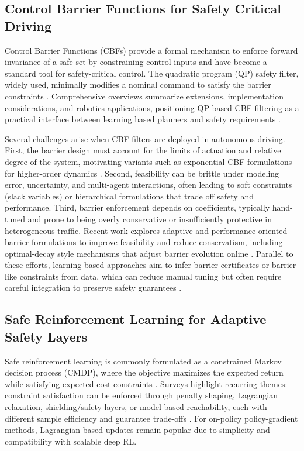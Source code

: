 %

\subsection{Control Barrier Functions for Safety Critical Driving}
Control Barrier Functions (CBFs) provide a formal mechanism to enforce forward invariance of a safe set by constraining control inputs and have become a standard tool for safety-critical control. The quadratic program (QP) safety filter, widely used, minimally modifies a nominal command to satisfy the barrier constraints \cite{ames2017cbf}. Comprehensive overviews summarize extensions, implementation considerations, and robotics applications, positioning QP-based CBF filtering as a practical interface between learning based planners and safety requirements \cite{ames_control_2019}.

Several challenges arise when CBF filters are deployed in autonomous driving. First, the barrier design must account for the limits of actuation and relative degree of the system, motivating variants such as exponential CBF formulations for higher-order dynamics \cite{nguyen2016ecbf}. Second, feasibility can be brittle under modeling error, uncertainty, and multi-agent interactions, often leading to soft constraints (slack variables) or hierarchical formulations that trade off safety and performance. Third, barrier enforcement depends on coefficients, typically hand-tuned and prone to being overly conservative or insufficiently protective in heterogeneous traffic. Recent work explores adaptive and performance-oriented barrier formulations to improve feasibility and reduce conservatism, including optimal-decay style mechanisms that adjust barrier evolution online \cite{zeng2021odcbf}. Parallel to these efforts, learning based approaches aim to infer barrier certificates or barrier-like constraints from data, which can reduce manual tuning but often require careful integration to preserve safety guarantees \cite{taylor2020learningcbf,qin2021neuralbarrier}.

\subsection{Safe Reinforcement Learning for Adaptive Safety Layers}
Safe reinforcement learning is commonly formulated as a constrained Markov decision process (CMDP), where the objective maximizes the expected return while satisfying expected cost constraints \cite{altman1999cmdp}. Surveys highlight recurring themes: constraint satisfaction can be enforced through penalty shaping, Lagrangian relaxation, shielding/safety layers, or model-based reachability, each with different sample efficiency and guarantee trade-offs \cite{garcia2015survey}. For on-policy policy-gradient methods, Lagrangian-based updates remain popular due to simplicity and compatibility with scalable deep RL.


